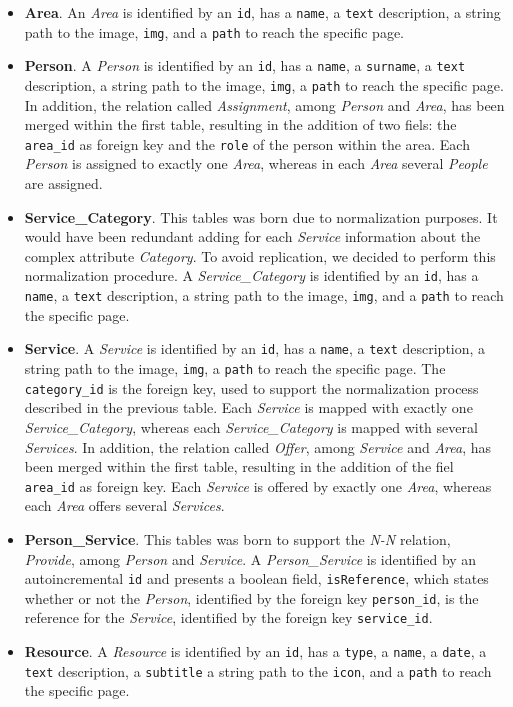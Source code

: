 \documentclass[12pt]{report}
\begin{document}
\begin{itemize}
	\item \textbf{Area}. An \emph{Area} is identified by an \texttt{id}, 
	has a \texttt{name}, a \texttt{text} description, a string path to the image, 
	\texttt{img}, and a \texttt{path} to reach the specific page. 
	\item \textbf{Person}. A \emph{Person} is identified by an \texttt{id}, 
	has a \texttt{name}, a \texttt{surname}, a \texttt{text} description, a 
	string path to the image, \texttt{img}, a \texttt{path} to reach the specific page.
	In addition, the relation called \emph{Assignment}, among \emph{Person} and \emph{Area}, has
	been merged within the first table, resulting in the addition of two fiels: the 
	\texttt{area\_id} as foreign key and the \texttt{role} of the person within the area.
	Each \emph{Person} is assigned to exactly one \emph{Area}, whereas in each \emph{Area} several
	\emph{People} are assigned.
	\item \textbf{Service\_Category}. This tables was born due to normalization purposes. 
	It would have been redundant adding for each \emph{Service} information about the complex 
	attribute \emph{Category}. To avoid replication, we decided to perform this normalization 
	procedure. A \emph{Service\_Category} is identified by an \texttt{id}, 
	has a \texttt{name}, a \texttt{text} description, a string path to the image, 
	\texttt{img}, and a \texttt{path} to reach the specific page. 
	\item \textbf{Service}. A \emph{Service} is identified by an \texttt{id}, 
	has a \texttt{name}, a \texttt{text} description, a string path to the image, \texttt{img}, 
	a \texttt{path} to reach the specific page.
	The \texttt{category\_id} is the foreign key, used to support the normalization process 
	described in the previous table. 
	Each \emph{Service} is mapped with exactly one \emph{Service\_Category}, whereas each 
	\emph{Service\_Category} is mapped with several \emph{Services}.
	In addition, the relation called \emph{Offer}, among 
	\emph{Service} and \emph{Area}, has	been merged within the first table, resulting in 
	the addition of the fiel \texttt{area\_id} as foreign key.
	Each \emph{Service} is offered by exactly one \emph{Area}, whereas each \emph{Area} offers 
	several \emph{Services}.
	\item \textbf{Person\_Service}. This tables was born to support the \emph{N-N} relation, 
	\emph{Provide}, among \emph{Person} and \emph{Service}. A \emph{Person\_Service} is 
	identified by an autoincremental \texttt{id} and presents a boolean field, \texttt{isReference}, 
	which states whether or not the \emph{Person}, identified by the foreign key \texttt{person\_id}, 
	is the reference for the \emph{Service}, identified by the foreign key \texttt{service\_id}.
	\item \textbf{Resource}. A \emph{Resource} is identified by an \texttt{id}, has a 
	\texttt{type}, a \texttt{name}, a \texttt{date}, a \texttt{text} description, a \texttt{subtitle} 
	a string path to the \texttt{icon}, and a \texttt{path} to reach the specific page. 
\end{itemize}
\end{document}
